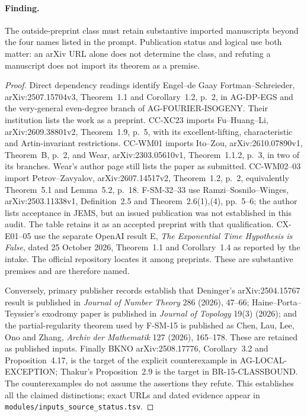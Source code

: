 \paragraph{Finding.}
The outside-preprint class must retain substantive imported manuscripts
beyond the four names listed in the prompt.  Publication status and
logical use both matter: an arXiv URL alone does not determine the class,
and refuting a manuscript does not import its theorem as a premise.

\begin{proof}
Direct dependency readings identify Engel--de Gaay Fortman--Schreieder,
arXiv:2507.15704v3, Theorem~1.1 and Corollary~1.2, p.~2, in AG-DP-EGS
and the very-general even-degree branch of AG-FOURIER-ISOGENY.
Their institution lists the work as a preprint.  CC-XC23 imports
Fu--Huang--Li, arXiv:2609.38801v2, Theorem~1.9, p.~5, with its
excellent-lifting, characteristic and Artin-invariant restrictions.
CC-WM01 imports Ito--Zou, arXiv:2610.07890v1, Theorem~B, p.~2,
and Wear, arXiv:2303.05610v1, Theorem~1.1.2, p.~3, in two of its
branches.  Wear's author page still lists the paper as submitted.
CC-WM02--03 import Petrov--Zavyalov,
arXiv:2607.14517v2, Theorem~1.2, p.~2, equivalently
Theorem~5.1 and Lemma~5.2, p.~18.  F-SM-32--33 use
Ramzi--Sosnilo--Winges, arXiv:2503.11338v1,
Definition~2.5 and Theorem~2.6(1),(4), pp.~5--6; the author lists
acceptance in JEMS, but an issued publication was not established in
this audit.  The table retains it as an accepted preprint with that
qualification.  CX-E01--05 use the separate OpenAI result E,
\emph{The Exponential Time Hypothesis is False}, dated 25 October 2026,
Theorem~1.1 and Corollary~1.4 as reported by the intake.  The official
repository locates it among preprints.  These are substantive premises
and are therefore named.

Conversely, primary publisher records establish that Deninger's
arXiv:2504.15767 result is published in \emph{Journal of Number Theory}
286 (2026), 47--66; Haine--Porta--Teyssier's exodromy paper is published
in \emph{Journal of Topology} 19(3) (2026); and the partial-regularity
theorem used by F-SM-15 is published as Chen, Lau, Lee, Ono and Zhang,
\emph{Archiv der Mathematik} 127 (2026), 165--178.
These are retained as published inputs.  Finally BKNO
arXiv:2508.17776, Corollary~3.2 and Proposition~4.17, is the target
of the explicit counterexample in AG-LOCAL-EXCEPTION; Thakur's
Proposition~2.9 is the target in BR-15-CLASSBOUND.  The counterexamples
do not assume the assertions they refute.  This establishes all the
claimed distinctions; exact URLs and dated evidence appear in
\texttt{modules/inputs\_source\_status.tsv}.
\end{proof}

